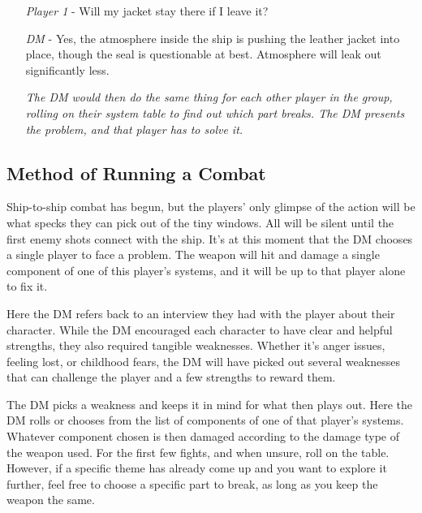 \documentclass[a4paper]{article}
\begin{document}
\begin{enumerate}[leftmargin=2cm]
\item [\textit{Player 1}] - Will my jacket stay there if I leave it? 
\item [\textit{DM}] - Yes, the atmosphere inside the ship is pushing the leather jacket into place, though the seal is questionable at best. Atmosphere will leak out significantly less.
\item [] \textit{The DM would then do the same thing for each other player in the group, rolling on their system table to find out which part breaks. The DM presents the problem, and that player has to solve it.}
\end{enumerate}

\subsection{Method of Running a Combat}

Ship-to-ship combat has begun, but the players' only glimpse of the action will be what specks they can pick out of the tiny windows. All will be silent until the first enemy shots connect with the ship. It's at this moment that the DM chooses a single player to face a problem. The weapon will hit and damage a single component of one of this player's systems, and it will be up to that player alone to fix it.

Here the DM refers back to an interview they had with the player about their character. While the DM encouraged each character to have clear and helpful strengths, they also required tangible weaknesses. Whether it's anger issues, feeling lost, or childhood fears, the DM will have picked out several weaknesses that can challenge the player and a few strengths to reward them.

The DM picks a weakness and keeps it in mind for what then plays out. Here the DM rolls or chooses from the list of components of one of that player's systems. Whatever component chosen is then damaged according to the damage type of the weapon used. For the first few fights, and when unsure, roll on the table. However, if a specific theme has already come up and you want to explore it further, feel free to choose a specific part to break, as long as you keep the weapon the same.
\end{document}
